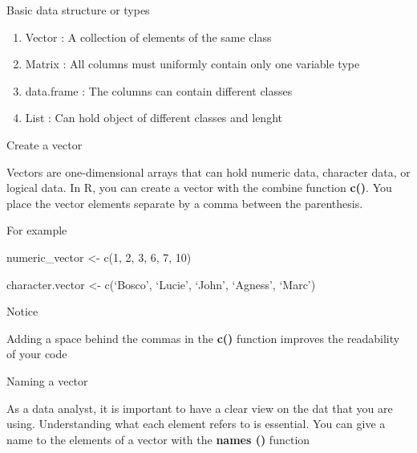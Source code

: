 \documentclass[ignorenonframetext,]{beamer}
\providecommand{\tightlist}{%
  \setlength{\itemsep}{0pt}\setlength{\parskip}{0pt}}
\begin{document}
\begin{frame}{Basic data structure or types}

\begin{enumerate}
\def\labelenumi{\arabic{enumi}.}
\tightlist
\item
  Vector : A collection of elements of the same class
\item
  Matrix : All columns must uniformly contain only one variable type
\item
  data.frame : The columns can contain different classes
\item
  List : Can hold object of different classes and lenght
\end{enumerate}

\end{frame}

\begin{frame}{Create a vector}

Vectors are one-dimensional arrays that can hold numeric data, character
data, or logical data. In R, you can create a vector with the combine
function \textbf{c()}. You place the vector elements separate by a comma
between the parenthesis.

\begin{block}{For example}

numeric\_vector \textless{}- c(1, 2, 3, 6, 7, 10)

character.vector \textless{}- c(`Bosco', `Lucie', `John', `Agness',
`Marc')

\end{block}

\begin{block}{Notice}

Adding a space behind the commas in the \textbf{c()} function improves
the readability of your code

\end{block}

\begin{block}{Naming a vector}

As a data analyst, it is important to have a clear view on the dat that
you are using. Understanding what each element refers to is essential.
You can give a name to the elements of a vector with the
\textbf{names ()} function

\end{block}

\end{frame}
\end{document}
